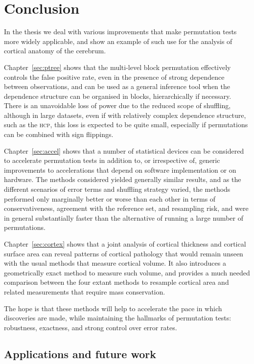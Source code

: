 \chapter{Conclusion}
\label{sec:conclusion}
\setstretch{\lspac}

In the thesis we deal with various improvements that make permutation tests more widely applicable, and show an example of such use for the analysis of cortical anatomy of the cerebrum.

Chapter~\ref{sec:ptree} shows that the multi-level block permutation effectively controls the false positive rate, even in the presence of strong dependence between observations, and can be used as a general inference tool when the dependence structure can be organised in blocks, hierarchically if necessary. There is an unavoidable loss of power due to the reduced scope of shuffling, although in large datasets, even if with relatively complex dependence structure, such as the \textsc{hcp}, this loss is expected to be quite small, especially if permutations can be combined with sign flippings.

Chapter~\ref{sec:accel} shows that a number of statistical devices can be considered to accelerate permutation tests in addition to, or irrespective of, generic improvements to accelerations that depend on software implementation or on hardware. The methods considered yielded generally similar results, and as the different scenarios of error terms and shuffling strategy varied, the methods performed only marginally better or worse than each other in terms of conservativeness, agreement with the reference set, and resampling risk, and were in general substantially faster than the alternative of running a large number of permutations.

Chapter~\ref{sec:cortex} shows that a joint analysis of cortical thickness and cortical surface area can reveal patterns of cortical pathology that would remain unseen with the usual methods that measure cortical volume. It also introduces a geometrically exact method to measure such volume, and provides a much needed comparison between the four extant methods to resample cortical area and related measurements that require mass conservation.

The hope is that these methods will help to accelerate the pace in which discoveries are made, while maintaining the hallmarks of permutation tests: robustness, exactness, and strong control over error rates.

\section{Applications and future work}

